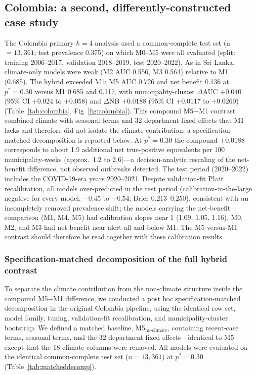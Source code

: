 \documentclass[11pt,a4paper]{article}
\begin{document}
\subsection{Colombia: a second, differently-constructed case study}
The Colombia primary $h=4$ analysis used a common-complete test set (n${}=13{,}361$; test prevalence 0.375) on which M0--M5 were all evaluated (split: training 2006--2017, validation 2018--2019, test 2020--2022). As in Sri Lanka, climate-only models were weak (M2 AUC 0.556, M3 0.564) relative to M1 (0.685). The hybrid exceeded M1: M5 AUC 0.726 and net benefit 0.136 at $p^*=0.30$ versus M1 0.685 and 0.117, with municipality-cluster $\Delta$AUC $+0.040$ (95\% CI $+0.024$ to $+0.058$) and $\Delta$NB $+0.0188$ (95\% CI $+0.0117$ to $+0.0260$) (Table~\ref{tab:colombia}, Fig~\ref{fig:colombia}). This compound M5$-$M1 contrast combined climate with seasonal terms and 32 department fixed effects that M1 lacks and therefore did not isolate the climate contribution; a specification-matched decomposition is reported below. At $p^*=0.30$ the compound $+0.0188$ corresponds to about 1.9 additional net true-positive equivalents per 100 municipality-weeks (approx.\ 1.2 to 2.6)---a decision-analytic rescaling of the net-benefit difference, not observed outbreaks detected. The test period (2020--2022) includes the COVID-19-era years 2020--2021. Despite validation-fit Platt recalibration, all models over-predicted in the test period (calibration-in-the-large negative for every model, $-0.45$ to $-0.54$; Brier 0.213--0.250), consistent with an incompletely removed prevalence shift; the models carrying the net-benefit comparison (M1, M4, M5) had calibration slopes near 1 (1.09, 1.05, 1.16). M0, M2, and M3 had net benefit near alert-all and below M1. The M5-versus-M1 contrast should therefore be read together with these calibration results.

\subsubsection*{Specification-matched decomposition of the full hybrid contrast}
To separate the climate contribution from the non-climate structure inside the compound M5$-$M1 difference, we conducted a post hoc specification-matched decomposition in the original Colombia pipeline, using the identical row set, model family, tuning, validation-fit recalibration, and municipality-cluster bootstrap. We defined a matched baseline, M5$_{\text{no-climate}}$, containing recent-case terms, seasonal terms, and the 32 department fixed effects---identical to M5 except that the 18 climate columns were removed. All models were evaluated on the identical common-complete test set ($n=13{,}361$) at $p^*=0.30$ (Table~\ref{tab:matcheddecomp}).
\end{document}
